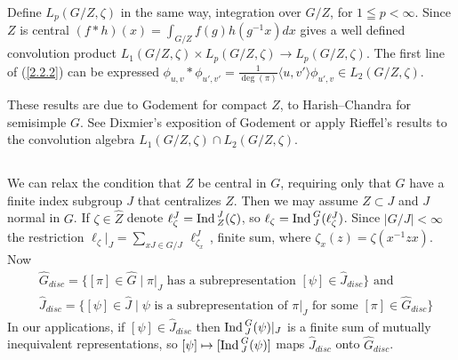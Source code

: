 \documentclass{conm-p-l}
\def\Ind{{\rm Ind\,}}
\begin{document}
Define $L_p(G/Z,\zeta)$ in the same way, integration over $G/Z$,
for $1 \leqq p < \infty$.  Since $Z$ is central 
$(f*h)(x) = \int_{G/Z} f(g)h(g^{-1}x) dx$ gives a well defined
convolution product $L_1(G/Z,\zeta) \times L_p(G/Z,\zeta)
\to L_p(G/Z,\zeta)$.  The first line of (\ref{2.2.2}) can be
expressed $\phi_{u,v}*\phi_{u',v'} = \frac{1}{\deg(\pi)}
\langle u, v' \rangle \phi_{u',v} \in L_2(G/Z,\zeta)$.  

These results are due to Godement \cite{G1947} for compact $Z$,
to Harish--Chandra \cite{HC1956b} for semisimple $G$.
See Dixmier's exposition 
\cite[\S 14]{D1964} of Godement or apply Rieffel's
results \cite{R1969} to the convolution algebra
$L_1(G/Z,\zeta)\cap L_2(G/Z,\zeta)$.

\subsection{}\label{ssec2c} 
\setcounter{equation}{0}
We can relax the condition that
$Z$ be central in $G$, requiring only that $G$ have a finite
index subgroup $J$ that centralizes $Z$.  Then we may assume 
$Z \subset J$ and $J$ normal in $G$.  If $\zeta \in \widehat{Z}$
denote $\ell_\zeta^J = \Ind_Z^J(\zeta)$, so $\ell_\zeta =
\Ind_J^G(\ell_\zeta^J)$.  Since $|G/J| < \infty$ the restriction
$\ell_\zeta|_J = \sum_{xJ \in G/J}\,\ell_{\zeta_x}^J$\,, finite
sum, where $\zeta_x(z) = \zeta(x^{-1}zx)$.  Now
\begin{equation}\label{2.3.2}
\begin{aligned}
&\widehat{G}_{disc} = \{[\pi] \in \widehat{G} \mid \pi|_J 
 \text{ has a subrepresentation } [\psi] \in \widehat{J}_{disc}\} 
 \text{ and }\\
&\widehat{J}_{disc} = \{[\psi] \in \widehat{J} \mid \psi
 \text{ is a subrepresentation of }\pi|_J \text{ for some }
 [\pi] \in \widehat{G}_{disc}\}
\end{aligned}
\end{equation}
In our applications, if $[\psi] \in \widehat{J}_{disc}$ then
$\Ind_J^G(\psi)|_J$ is a finite sum of mutually inequivalent 
representations, so $[\psi] \mapsto [\Ind_J^G(\psi)]$ maps
$\widehat{J}_{disc}$ onto $\widehat{G}_{disc}$.
\end{document}
